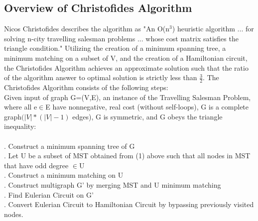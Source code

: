 \documentclass[12pt, oneside]{article}   	%
\begin{document}
\subsection{Overview of Christofides Algorithm}
\indent\indent Nicos Christofides describes the algorithm as "An O(n$^3$) heuristic algorithm ... for solving n-city travelling salesman problems ... whose cost matrix satisfies the triangle condition."  Utilizing the creation of a minimum spanning tree, a minimum matching on a subset of V, and the creation of a Hamiltonian circuit, the Christofides Algorithm achieves an approximate solution such that the ratio of the algorithm answer to optimal solution is strictly less than $\frac{3}{2}$.  The Christofides Algorithm consists of the following steps:\\
\indent\indent Given input of graph G=(V,E), an instance of the Travelling Salesman Problem, where all e$\in$E have nonnegative, real cost (without self-loops), G is a complete graph$(|V|*(|V|-1)$ edges), G is symmetric, and G obeys the triangle inequality:\\\\
\indent{}.  Construct a minimum spanning tree of G\\
\indent{}.  Let U be a subset of MST obtained from (1) above such that all nodes in \indent\indent\indent MST that have odd degree $\in$U\\
\indent{}.  Construct a minimum matching on U\\
\indent{}.  Construct multigraph G' by merging MST and U minimum matching\\
\indent{}.  Find Eulerian Circuit on G'\\
\indent{}.  Convert Eulerian Circuit to Hamiltonian Circuit by bypassing previously \indent\indent\indent visited nodes.\\
\end{document}

